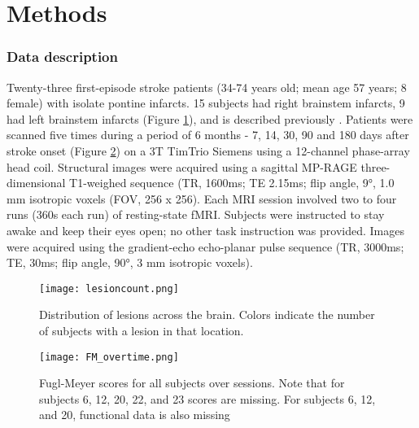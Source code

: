 \documentclass[10pt]{article}
\begin{document}
	\section*{Methods} \label{sec:firstpage}
	
	\subsubsection*{Data description}
	 Twenty-three first-episode stroke patients (34-74 years old; mean age 57 years; 8 female) with isolate pontine infarcts. 15 subjects had right brainstem infarcts, 9 had left brainstem infarcts (Figure \ref{lesioncount}), and is described previously  \cite{Lu2011-ow}. Patients were scanned five times during a period of 6 months - 7, 14, 30, 90 and 180 days after stroke onset (Figure \ref{FMscores}) on a 3T TimTrio Siemens using a 12-channel phase-array head coil. Structural images were acquired using a sagittal MP-RAGE three-dimensional T1-weighed sequence (TR, 1600ms; TE 2.15ms; flip angle, 9°, 1.0 mm isotropic voxels (FOV, 256 x 256). Each MRI session involved two to four runs (360s each run) of resting-state fMRI. Subjects were instructed to stay awake and keep their eyes open; no other task instruction was provided. Images were acquired using the gradient-echo echo-planar pulse sequence (TR, 3000ms; TE, 30ms; flip angle, 90°, 3 mm isotropic voxels).
	\begin{figure}[h]
	   	\begin{center}
			\texttt{[image: lesioncount.png]}
			\caption{Distribution of lesions across the brain. Colors indicate the number of subjects with a lesion in that location.}
			\centering
			\label{lesioncount}
		\end{center}
	\end{figure}

	\begin{figure}[h]
	\begin{center}
		\texttt{[image: FM\_overtime.png]}
		\caption{Fugl-Meyer scores for all subjects over sessions. Note that for subjects 6, 12, 20, 22, and 23 scores are missing. For subjects 6, 12, and 20, functional data is also missing}
		\centering
		\label{FMscores}
	\end{center}
\end{figure}
\end{document}
